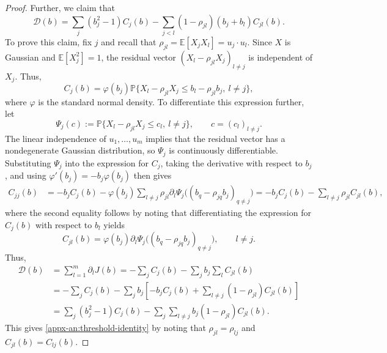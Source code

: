 \documentclass[11pt,letterpaper]{article}
\theoremstyle{remark}
\newcommand{\E}{\mathbb E}
\newcommand{\Pp}{\mathbb P}
\begin{document}
\begin{proof}
Further, we claim that
\begin{equation}
 \mathcal D(b)=\sum_j(b_j^2-1)C_j(b)
   -\sum_{j<l}(1-\rho_{jl})(b_j+b_l)C_{jl}(b).
 \label{appx-an:threshold-identity}
\end{equation}
To prove this claim,
fix \(j\) and recall that \(\rho_{jl}=\E[X_jX_l]=u_j\cdot u_l\).
Since \(X\) is Gaussian and \(\E[X_j^2]=1\), the residual
vector \((X_l-\rho_{jl}X_j)_{l\ne j}\) is independent of \(X_j\).
Thus,
\begin{equation}\label{appx-an:conditional-first-derivative}
C_j(b)
=\varphi(b_j)\Pp\{X_l-\rho_{jl}X_j \le b_l-\rho_{jl}b_j,\ l\ne j\},
\end{equation}
where \(\varphi\) is the standard normal density. To differentiate this expression further, let
\[
\Psi_j(c):=\Pp\{X_l-\rho_{jl}X_j\le c_l,\ l\ne j\},
\qquad c=(c_l)_{l\ne j}.
\]
The linear independence of \(u_1,\ldots,u_m\) implies that
the residual vector has a nondegenerate Gaussian distribution,
so \(\Psi_j\) is continuously differentiable. Substituting $\Psi_j$ into the expression for $C_j$, taking the derivative with respect to $b_j$, and using \(\varphi'(b_j)=-b_j\varphi(b_j)\) then gives
\begin{align*}
C_{jj}(b)
&=-b_jC_j(b)
 -\varphi(b_j)\sum_{l\ne j}\rho_{jl}
 \partial_l\Psi_j\big((b_q-\rho_{jq}b_j)_{q\ne j}\big)=-b_jC_j(b)-\sum_{l\ne j}\rho_{jl}C_{jl}(b),
\end{align*}
where the second equality follows by noting that differentiating the
expression for \(C_j(b)\) with respect to \(b_l\) yields
\[
C_{jl}(b)
=\varphi(b_j)
\partial_l\Psi_j\big((b_q-\rho_{jq}b_j)_{q\ne j}\big),
\qquad l\ne j.
\]
Thus,
\[
\begin{aligned}
\mathcal D(b)
&=\sum_{l=1}^m\partial_lJ(b)=-\sum_j C_j(b)
  -\sum_j b_j\sum_l C_{jl}(b)\\
&=-\sum_j C_j(b)
  -\sum_j b_j\left[
      -b_jC_j(b)
      +\sum_{l\ne j}(1-\rho_{jl})C_{jl}(b)
    \right]\\
&=\sum_j(b_j^2-1)C_j(b)
  -\sum_j\sum_{l\ne j}
       b_j(1-\rho_{jl})C_{jl}(b).
\end{aligned}
\]
This gives \eqref{appx-an:threshold-identity} by noting that \(\rho_{jl}=\rho_{lj}\) and \(C_{jl}(b)=C_{lj}(b)\).



\end{proof}
\end{document}
